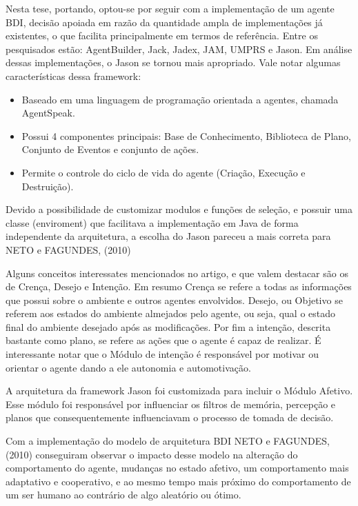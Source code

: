 \documentclass[a4paper,12pt]{article}
\begin{document}
Nesta tese, portando, optou-se por seguir com a implementação de um agente BDI, decisão apoiada em razão da quantidade ampla de implementações já existentes, o que facilita principalmente em termos de referência. Entre os pesquisados estão: AgentBuilder, Jack, Jadex, JAM, UMPRS e Jason. Em análise dessas implementações, o Jason se tornou mais apropriado. Vale notar algumas características dessa framework:

\begin{itemize}
    \item Baseado em uma linguagem de programação orientada a agentes, chamada AgentSpeak.

    \item Possui 4 componentes principais: Base de Conhecimento, Biblioteca de Plano, Conjunto de Eventos e conjunto de ações.

    \item Permite o controle do ciclo de vida do agente (Criação, Execução e Destruição).
\end{itemize}

Devido a possibilidade de customizar modulos e funções de seleção, e possuir uma classe (enviroment) que facilitava a implementação em Java de forma independente da arquitetura, a escolha do Jason pareceu a mais correta para NETO e FAGUNDES, (2010)

Alguns conceitos interessates mencionados no artigo, e que valem destacar são os de Crença, Desejo e Intenção. Em resumo Crença se refere a todas as informações que possui sobre o ambiente e outros agentes envolvidos. Desejo, ou Objetivo se referem aos estados do ambiente almejados pelo agente, ou seja, qual o estado final do ambiente desejado após as modificações. Por fim a intenção, descrita bastante como plano, se refere as ações que o agente é capaz de realizar. É interessante notar que o Módulo de intenção é responsável por motivar ou orientar o agente dando a ele autonomia e automotivação.

A arquitetura da framework Jason foi customizada para incluir o Módulo Afetivo. Esse módulo foi responsável por influenciar os filtros de memória, percepção e planos que consequentemente influenciavam o processo de tomada de decisão.

Com a implementação do modelo de arquitetura BDI NETO e FAGUNDES, (2010) conseguiram observar o impacto desse modelo na alteração do comportamento do agente, mudanças no estado afetivo, um comportamento mais adaptativo e cooperativo, e ao mesmo tempo mais próximo do comportamento de um ser humano ao contrário de algo aleatório ou ótimo.
\end{document}
